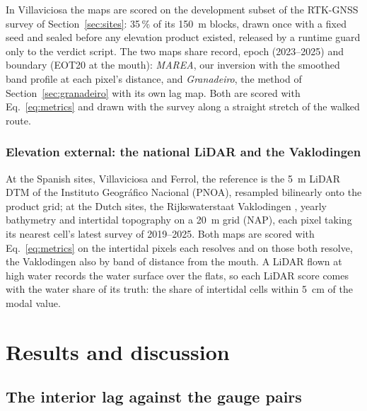 In Villaviciosa the maps are scored on the development subset of the
RTK-GNSS survey of Section~\ref{sec:sites}: 35\,\% of its 150~m blocks,
drawn once with a fixed seed and sealed before any elevation product
existed, released by a runtime guard only to the verdict script. The two
maps share record, epoch (2023--2025) and boundary (EOT20 at the mouth):
\emph{MAREA}, our inversion with the smoothed band profile at each
pixel's distance, and \emph{Granadeiro}, the method of
Section~\ref{sec:granadeiro} with its own lag map. Both are scored with
Eq.~\eqref{eq:metrics} and drawn with the survey along a straight
stretch of the walked route.

\subsubsection{Elevation external: the national LiDAR and the Vaklodingen}

At the Spanish sites, Villaviciosa and Ferrol, the reference is the 5~m
LiDAR DTM of the Instituto Geogr\'afico Nacional (PNOA),
resampled bilinearly onto the product grid; at the Dutch sites, the
Rijkswaterstaat Vaklodingen \cite{rws_vaklodingen}, yearly bathymetry
and intertidal topography on a 20~m grid (NAP), each pixel taking its
nearest cell's latest survey of 2019--2025. Both maps are scored with
Eq.~\eqref{eq:metrics} on the intertidal pixels each resolves and on
those both resolve, the Vaklodingen also by band of distance from the
mouth. A LiDAR flown at high water records the water surface over the
flats, so each LiDAR score comes with the water share of its truth: the
share of intertidal cells within 5~cm of the modal value.

\section{Results and discussion}\label{sec:results}

\subsection{The interior lag against the gauge pairs}\label{sec:res_lag}

